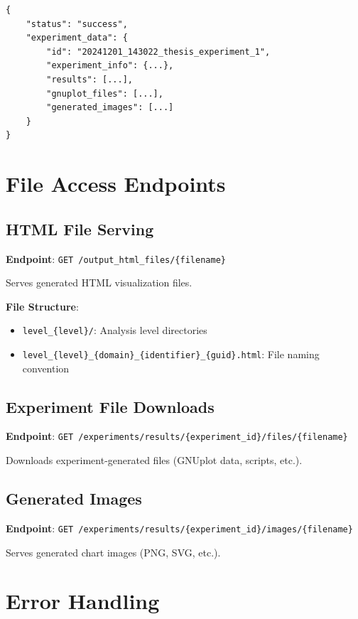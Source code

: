 \begin{verbatim}
{
    "status": "success",
    "experiment_data": {
        "id": "20241201_143022_thesis_experiment_1",
        "experiment_info": {...},
        "results": [...],
        "gnuplot_files": [...],
        "generated_images": [...]
    }
}
\end{verbatim}

\section{File Access Endpoints}
\label{sec:file-endpoints}

\subsection{HTML File Serving}
\label{subsec:html-serving}

\textbf{Endpoint}: \texttt{GET /output\_html\_files/\{filename\}}

Serves generated HTML visualization files.

\textbf{File Structure}:
\begin{itemize}
    \item \texttt{level\_\{level\}/}: Analysis level directories
    \item \texttt{level\_\{level\}\_\{domain\}\_\{identifier\}\_\{guid\}.html}: File naming convention
\end{itemize}

\subsection{Experiment File Downloads}
\label{subsec:experiment-files}

\textbf{Endpoint}: \texttt{GET /experiments/results/\{experiment\_id\}/files/\{filename\}}

Downloads experiment-generated files (GNUplot data, scripts, etc.).

\subsection{Generated Images}
\label{subsec:generated-images}

\textbf{Endpoint}: \texttt{GET /experiments/results/\{experiment\_id\}/images/\{filename\}}

Serves generated chart images (PNG, SVG, etc.).

\section{Error Handling}
\label{sec:error-handling}

